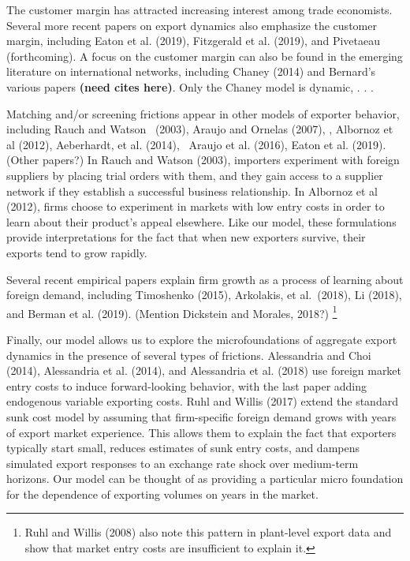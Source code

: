 \documentclass[12pt]{article}
\begin{document}
The customer margin has attracted increasing interest among trade
economists. Several more recent papers on export dynamics also emphasize the
customer margin, including Eaton et al. (2019), Fitzgerald et al. (2019),
and Pivetaeau (forthcoming). A focus on the customer margin can also be
found in the emerging literature on international networks, including Chaney
(2014) and Bernard's various papers \textbf{(need cites here)}. Only the
Chaney model is dynamic, . . .

Matching and/or screening frictions appear in other models of exporter
behavior, including Rauch and Watson \ (2003), Araujo and Ornelas (2007), ,
Albornoz et al (2012), Aeberhardt, et al. (2014), \ Araujo et al. (2016),
Eaton et al. (2019). (Other papers?) In Rauch and Watson (2003), importers
experiment with foreign suppliers by placing trial orders with them, and
they gain access to a supplier network if they establish a successful
business relationship. In Albornoz et al (2012), firms choose to experiment
in markets with low entry costs in order to learn about their product's
appeal elsewhere. Like our model, these formulations provide interpretations
for the fact that when new exporters survive, their exports tend to grow
rapidly.

Several recent empirical papers explain firm growth as a process of learning
about foreign demand, including Timoshenko (2015), Arkolakis, et al.\
(2018), Li (2018), and Berman et al. (2019). (Mention Dickstein and Morales,
2018?) \renewcommand{\baselinestretch}{1}\footnote{%
Ruhl and Willis (2008) also note this pattern in plant-level export data and
show that market entry costs are insufficient to explain it.}

Finally, our model allows us to explore the microfoundations of aggregate
export dynamics in the presence of several types of frictions. Alessandria
and Choi (2014), Alessandria et al. (2014), and Alessandria et al. (2018)
use foreign market entry costs to induce forward-looking behavior, with the
last paper adding endogenous variable exporting costs. Ruhl and Willis
(2017) extend the standard sunk cost model by assuming that firm-specific
foreign demand grows with years of export market experience. This allows
them to explain the fact that exporters typically start small, reduces
estimates of sunk entry costs, and dampens simulated export responses to an
exchange rate shock over medium-term horizons. Our model can be thought of
as providing a particular micro foundation for the dependence of exporting
volumes on years in the market.
\end{document}
